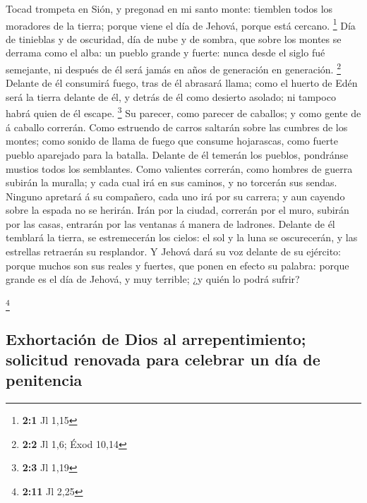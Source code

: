  Tocad trompeta en Sión, y pregonad en mi santo monte:
tiemblen todos los moradores de la tierra; porque viene el día de
Jehová, porque está cercano. \footnote{\textbf{2:1} Jl 1,15}
 Día de tinieblas y de oscuridad, día de nube y de sombra,
que sobre los montes se derrama como el alba: un pueblo grande y fuerte:
nunca desde el siglo fué semejante, ni después de él será jamás en años
de generación en generación. \footnote{\textbf{2:2} Jl 1,6; Éxod 10,14}
 Delante de él consumirá fuego, tras de él abrasará llama;
como el huerto de Edén será la tierra delante de él, y detrás de él como
desierto asolado; ni tampoco habrá quien de él escape. \footnote{\textbf{2:3}
  Jl 1,19}  Su parecer, como parecer de caballos; y como
gente de á caballo correrán.  Como estruendo de carros
saltarán sobre las cumbres de los montes; como sonido de llama de fuego
que consume hojarascas, como fuerte pueblo aparejado para la batalla.
 Delante de él temerán los pueblos, pondránse mustios
todos los semblantes.  Como valientes correrán, como
hombres de guerra subirán la muralla; y cada cual irá en sus caminos, y
no torcerán sus sendas.  Ninguno apretará á su compañero,
cada uno irá por su carrera; y aun cayendo sobre la espada no se
herirán.  Irán por la ciudad, correrán por el muro,
subirán por las casas, entrarán por las ventanas á manera de ladrones.
 Delante de él temblará la tierra, se estremecerán los
cielos: el sol y la luna se oscurecerán, y las estrellas retraerán su
resplandor.  Y Jehová dará su voz delante de su ejército:
porque muchos son sus reales y fuertes, que ponen en efecto su palabra:
porque grande es el día de Jehová, y muy terrible; ¿y quién lo podrá
sufrir?

\footnote{\textbf{2:11} Jl 2,25}

\hypertarget{exhortaciuxf3n-de-dios-al-arrepentimiento-solicitud-renovada-para-celebrar-un-duxeda-de-penitencia}{%
\subsection{Exhortación de Dios al arrepentimiento; solicitud renovada
para celebrar un día de
penitencia}\label{exhortaciuxf3n-de-dios-al-arrepentimiento-solicitud-renovada-para-celebrar-un-duxeda-de-penitencia}}

